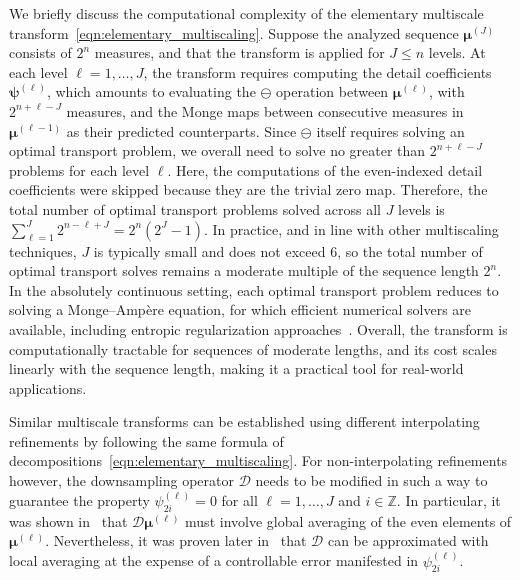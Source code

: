 \documentclass[12pt]{amsart}
\begin{document}
We briefly discuss the computational complexity of the elementary multiscale transform~\eqref{eqn:elementary_multiscaling}. Suppose the analyzed sequence $\boldsymbol{\mu}^{(J)}$ consists of $2^n$ measures, and that the transform is applied for $J \leq n$ levels. At each level $\ell = 1, \ldots, J$, the transform requires computing the detail coefficients $\boldsymbol{\psi}^{(\ell)}$, which amounts to evaluating the $\ominus$ operation between $\boldsymbol{\mu}^{(\ell)}$, with $2^{n+\ell-J}$ measures, and the Monge maps between consecutive measures in $\boldsymbol{\mu}^{(\ell-1)}$ as their predicted counterparts. Since $\ominus$ itself requires solving an optimal transport problem, we overall need to solve no greater than $2^{n+\ell-J}$ problems for each level $\ell$. Here, the computations of the even-indexed detail coefficients were skipped because they are the trivial zero map. Therefore, the total number of optimal transport problems solved across all $J$ levels is $\sum_{\ell=1}^{J} 2^{n-\ell+J} = 2^{n}(2^J-1)$. In practice, and in line with other multiscaling techniques, $J$ is typically small and does not exceed $6$, so the total number of optimal transport solves remains a moderate multiple of the sequence length $2^n$. In the absolutely continuous setting, each optimal transport problem reduces to solving a Monge--Amp\`ere equation, for which efficient numerical solvers are available, including entropic regularization approaches~\cite{peyre2019computational}. Overall, the transform is computationally tractable for sequences of moderate lengths, and its cost scales linearly with the sequence length, making it a practical tool for real-world applications.

Similar multiscale transforms can be established using different interpolating refinements by following the same formula of decompositions~\eqref{eqn:elementary_multiscaling}. For non-interpolating refinements however, the downsampling operator $\mathcal{D}$ needs to be modified in such a way to guarantee the property $\psi^{(\ell)}_{2i}=0$ for all $\ell=1,\dots,J$ and $i\in\mathbb{Z}$. In particular, it was shown in~\cite{dyn2021linear} that $\mathcal{D}\boldsymbol{\mu}^{(\ell)}$ must involve global averaging of the even elements of $\boldsymbol{\mu}^{(\ell)}$. Nevertheless, it was proven later in~\cite{mattar2023pyramid} that $\mathcal{D}$ can be approximated with local averaging at the expense of a controllable error manifested in $\psi^{(\ell)}_{2i}$.
\end{document}
